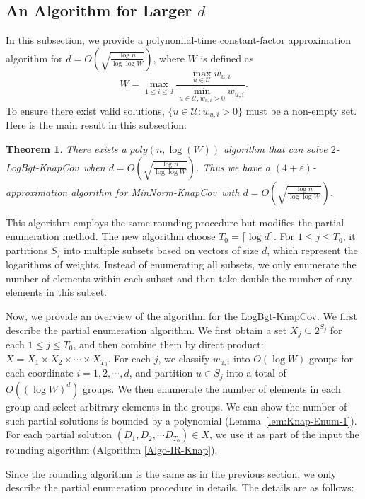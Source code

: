 \documentclass[11pt,a4paper]{article} \usepackage{enumitem}
\newcommand{\calU}{\mathcal{U}}
\newcommand{\minnormknapcov}{\textsf{MinNorm-KnapCov}}
\newcommand{\LBOknapcov}{\textsf{LogBgt-KnapCov}}
\newtheorem{theorem}{Theorem}[section]
\theoremstyle{definition}
\begin{document}
\subsection{An Algorithm for Larger $d$}
\label{sec:Knap-2}

In this subsection, we provide a polynomial-time constant-factor approximation algorithm for $d = O\left( \sqrt{\frac{\log n}{\log\log W}}\right)$, where $W$ is defined as
$$W=\max_{1\le i\le d} \frac{\max_{u\in \calU} w_{u,i}}{\min_{u\in \calU,w_{u,i}>0} w_{u,i}}.$$
To ensure there exist valid solutions, $\lbrace u\in \calU: w_{u,i}>0\rbrace$ must be a non-empty set. Here is the main result in this subsection:
\begin{theorem} \label{thm:knap-2}
There exists a \(poly(n, \log(W))\) algorithm that can solve $2$-\LBOknapcov\ when $d=O\left(\sqrt{\frac{\log n}{\log\log W}}\right)$. Thus we have a $(4+\varepsilon)$-approximation algorithm for \minnormknapcov\ with $d=O\left(\sqrt{\frac{\log n}{\log \log W}}\right)$.
\end{theorem}
This algorithm employs the same rounding procedure but modifies the partial enumeration method. The new algorithm choose $T_0=\lceil \log d\rceil$. For \( 1 \leq j \leq T_0 \), it partitions \( S_j \) into multiple subsets based on vectors of size \( d \), which represent the logarithms of weights. Instead of enumerating all subsets, we only enumerate the number of elements within each subset and then take double the number of any elements in this subset.


Now, we provide an overview of the algorithm for the \LBOknapcov . We first describe the partial enumeration algorithm. 
We first obtain a set $X_j\subseteq 2^{S_j}$ for each \(1 \le j \le T_0\), and then combine them by direct product: \(X = X_1 \times X_2 \times \cdots \times X_{T_0}\). For each \(j\), we classify \(w_{u,i}\) into \(O(\log W)\) groups for each coordinate \(i = 1, 2, \cdots, d\), and partition \(u \in S_j\) into a total of \(O((\log W)^d)\) groups. We then enumerate the number of elements in each group and select arbitrary elements in the groups.
We can show the number of such partial solutions is bounded by
a polynomial (Lemma~\ref{lem:Knap-Enum-1}).
For each partial solution \((D_1, D_2, \cdots D_{T_0}) \in X\), we use it as part of the input the rounding algorithm (Algorithm \ref{Algo-IR-Knap}). 

Since the rounding algorithm is the same as in the previous section, 
we only describe the partial enumeration procedure in details. 
The details are as follows:
\end{document}
